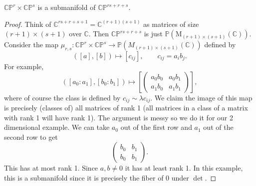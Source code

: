\begin{proposition}\label{lask}
	$\mathbb{C} \mathbb{P} ^r \times \mathbb{C} \mathbb{P} ^s$ is a submanifold of $\mathbb{C} \mathbb{P} ^{rs+r+s} $.
\end{proposition}
\begin{proof}
	Think of $\mathbb{C} ^{rs+r+s+1} =\mathbb{C} ^{(r+1)(s+1)} $ as matrices of size $(r+1)\times (s+1)$ over $\mathbb{C} $. Then $\mathbb{C} \mathbb{P} ^{rs+r+s} $ is just $\mathbb{P} (\mathrm{M}_{(r+1)\times (s+1)} (\mathbb{C} ))$. Consider the map $\mu_{r,s} : \mathbb{C} \mathbb{P} ^r\times \mathbb{C} \mathbb{P} ^s \to \mathbb{P} (M_{(r+1)\times (s+1)} (\mathbb{C} ))$ defined by
	\[
		([a],[b])\mapsto [c_{ij} ],\qquad c_{ij} =a_ib_j
	.\]
	For example,
	\[
		([a_0 : a_1],[b_0 : b_1])\mapsto \left[ \begin{pmatrix}
		a_0b_0 & a_0b_1 \\
		a_1b_0 & a_1b_1
		\end{pmatrix} \right] 
	,\]
	where of course the class is defined by $c_{ij} \sim \lambda c_{ij} $. We claim the image of this map is precisely (classes of) all matrices of rank 1 (all matrices in a class of a matrix with rank 1 will have rank 1). The argument is messy so we do it for our 2 dimensional example. We can take $a_0$ out of the first row and $a_1$ out of the second row to get
	\[
		\begin{pmatrix}
		b_0 & b_1 \\
		b_0 & b_1
		\end{pmatrix}
	.\]
	This has at most rank 1. Since $a,b\neq 0$ it has at least rank 1. In this example, this is a submanifold since it is precisely the fiber of 0 under $\det $. 
\end{proof}


